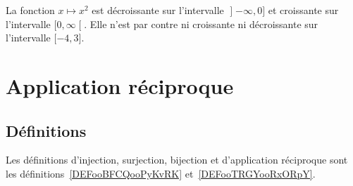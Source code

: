 \begin{example}
	La fonction \( x\mapsto x^2\) est décroissante sur l'intervalle \( \mathopen] -\infty , 0 \mathclose]\) et croissante sur l'intervalle \( \mathopen[ 0 , \infty \mathclose[\). Elle n'est par contre ni croissante ni décroissante sur l'intervalle \( \mathopen[ -4 , 3 \mathclose]\).
\end{example}

\section{Application réciproque}

\subsection{Définitions}

Les définitions d'injection, surjection, bijection et d'application réciproque sont les définitions~\ref{DEFooBFCQooPyKvRK} et~\ref{DEFooTRGYooRxORpY}.

